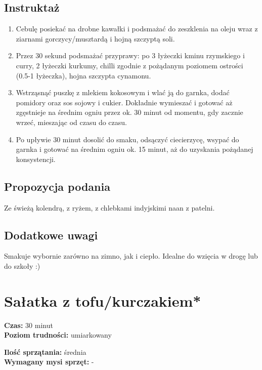 \documentclass[a4paper,10pt]{book}
\begin{document}
\subsection*{Instruktaż} \begin{enumerate} \item Cebulę posiekać na drobne kawałki i podsmażać do zeszklenia na oleju wraz z ziarnami gorczycy/musztardą i hojną szczyptą soli. \item Przez 30 sekund podsmażać przyprawy: po 3 łyżeczki kminu rzymskiego i curry, 2 łyżeczki kurkumy, chilli zgodnie z pożądanym poziomem ostrości (0.5-1 łyżeczka), hojna szczypta cynamonu. \item Wstrząsnąć puszkę z mlekiem kokosowym i wlać ją do garnka, dodać pomidory oraz sos sojowy i cukier. Dokładnie wymieszać i gotować aż zgęstnieje na średnim ogniu przez ok. 30 minut od momentu, gdy zacznie wrzeć, mieszając od czasu do czasu. \item Po upływie 30 minut dosolić do smaku, odsączyć ciecierzycę, wsypać do garnka i gotować na średnim ogniu ok. 15 minut, aż do uzyskania pożądanej konsystencji. \end{enumerate}

\vspace{0.5cm}

\small \subsection*{Propozycja podania} Ze świeżą kolendrą, z ryżem, z chlebkami indyjskimi naan z patelni.

\vspace{0.3cm}

\subsection*{Dodatkowe uwagi} Smakuje wybornie zarówno na zimno, jak i ciepło. Idealne do wzięcia w drogę lub do szkoły :)

\newpage 

\section{Sałatka z tofu/kurczakiem*}
\bigskip
\small
\begin{minipage}{0.45\textwidth}
    \noindent \textbf{Czas:} 30 minut \\
    \textbf{Poziom trudności:} umiarkowany
\end{minipage}
\begin{minipage}{0.45\textwidth}
    \noindent \textbf{Ilość sprzątania:} średnia\\
    \textbf{Wymagany mysi sprzęt:} -
\end{minipage}
\normalsize
\vspace{0.5cm}
\end{document}
